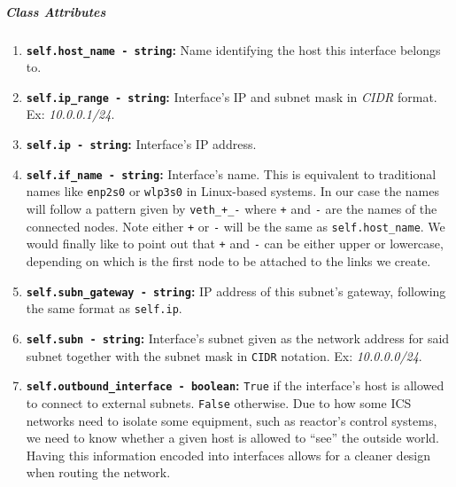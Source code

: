         \subparagraph{Class Attributes}
            \begin{enumerate}
                \item \textbf{\texttt{self.host\_name - string}:} Name identifying the host this interface belongs to.
                \item \textbf{\texttt{self.ip\_range - string}:} Interface's IP and subnet mask in \textit{CIDR} \cite{bib:cidr-notation} format. Ex: \textit{10.0.0.1/24}.
                \item \textbf{\texttt{self.ip - string}:} Interface's IP address.
                \item \textbf{\texttt{self.if\_name - string}:} Interface's name. This is equivalent to traditional names like \texttt{enp2s0} or \texttt{wlp3s0} in Linux-based systems. In our case the names will follow a pattern given by \texttt{veth\_+\_-} where \texttt{+} and \texttt{-} are the names of the connected nodes. Note either \texttt{+} or \texttt{-} will be the same as \texttt{self.host\_name}. We would finally like to point out that \texttt{+} and \texttt{-} can be either upper or lowercase, depending on which is the first node to be attached to the links we create.
                \item \textbf{\texttt{self.subn\_gateway - string}:} IP address of this subnet's gateway, following the same format as \texttt{self.ip}.
                \item \textbf{\texttt{self.subn - string}:} Interface's subnet given as the network address for said subnet together with the subnet mask in \texttt{CIDR} notation. Ex: \textit{10.0.0.0/24}.
                \item \textbf{\texttt{self.outbound\_interface - boolean}:} \texttt{True} if the interface's host is allowed to connect to external subnets. \texttt{False} otherwise. Due to how some ICS networks need to isolate some equipment, such as reactor's control systems, we need to know whether a given host is allowed to ``see'' the outside world. Having this information encoded into interfaces allows for a cleaner design when routing the network.
            \end{enumerate}

